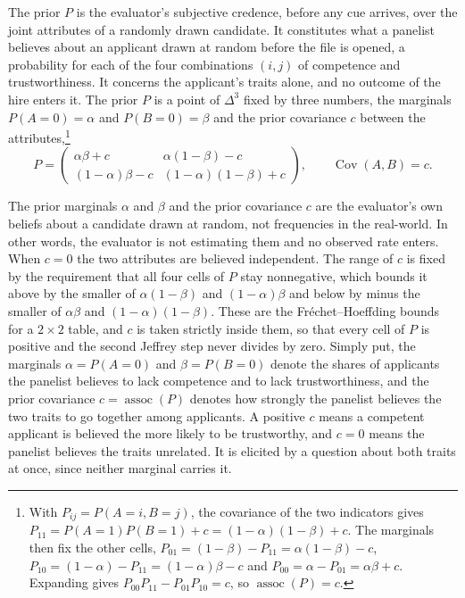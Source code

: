 \documentclass[a4paper,fleqn]{cas-sc}
\theoremstyle{remark}
\theoremstyle{definition}
\newcommand{\assoc}{\operatorname{assoc}}
\begin{document}
The prior $P$ is the evaluator's subjective credence, before any cue arrives, over the joint attributes of a randomly drawn candidate. It constitutes what a panelist believes about an applicant drawn at random before the file is opened, a probability for each of the four combinations $(i,j)$ of competence and trustworthiness. It concerns the applicant's traits alone, and no outcome of the hire enters it. The prior $P$ is a point of $\Delta^{3}$ fixed by three numbers, the marginals
$P(A{=}0)=\alpha$ and $P(B{=}0)=\beta$ and the prior covariance $c$ between the
attributes,\footnote{With $P_{ij}=P(A{=}i,B{=}j)$, the covariance of the two indicators gives $P_{11}=P(A{=}1)P(B{=}1)+c=(1-\alpha)(1-\beta)+c$. The marginals then fix the other cells, $P_{01}=(1-\beta)-P_{11}=\alpha(1-\beta)-c$, $P_{10}=(1-\alpha)-P_{11}=(1-\alpha)\beta-c$ and $P_{00}=\alpha-P_{01}=\alpha\beta+c$. Expanding gives $P_{00}P_{11}-P_{01}P_{10}=c$, so $\assoc(P)=c$.}
\[
  P=\begin{pmatrix}\alpha\beta+c & \alpha(1-\beta)-c\\[2pt](1-\alpha)\beta-c & (1-\alpha)(1-\beta)+c\end{pmatrix},
  \qquad \operatorname{Cov}(A,B)=c.
\]

The prior marginals $\alpha$ and $\beta$ and the prior covariance $c$ are the evaluator's own beliefs about a candidate drawn at random, not frequencies in
the real-world. In other words, the evaluator is not estimating them and no observed rate enters. When $c=0$ the two attributes are believed independent. The range of $c$ is
fixed by the requirement that all four cells of $P$ stay nonnegative, which
bounds it above by the smaller of $\alpha(1-\beta)$ and $(1-\alpha)\beta$ and
below by minus the smaller of $\alpha\beta$ and $(1-\alpha)(1-\beta)$. These
are the Fr\'echet--Hoeffding bounds for a $2\times2$ table, and $c$ is taken strictly inside them, so that every cell of $P$ is positive and the second Jeffrey step never divides by zero. Simply put, the marginals $\alpha=P(A{=}0)$ and $\beta=P(B{=}0)$ denote the shares
of applicants the panelist believes to lack competence and to lack trustworthiness,
and the prior covariance $c=\assoc(P)$ denotes how strongly the panelist believes
the two traits to go together among applicants. A positive $c$ means a competent
applicant is believed the more likely to be trustworthy, and $c=0$ means the
panelist believes the traits unrelated. It is elicited by a question about both
traits at once, since neither marginal carries it.
\end{document}
